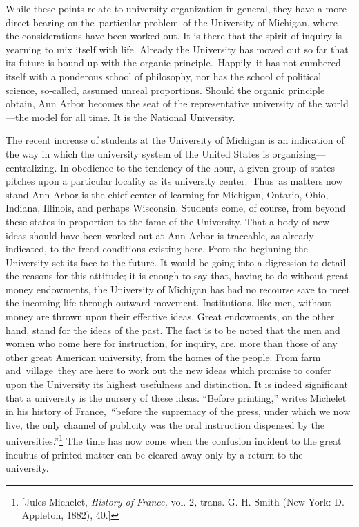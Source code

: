 \documentclass[openany,nobib]{tufte-book}
\begin{document}
While these points relate to university organization in general, they
have a more direct bearing on the~particular problem~of the University
of Michigan, where the considerations have been worked out. It is there
that the spirit of inquiry is yearning to mix itself with life. Already
the University has moved out so far that its future is bound up with the
organic principle.~Happily~it has not cumbered itself with a ponderous
school of philosophy, nor has the school of political science,
so-called, assumed unreal proportions. Should the organic principle
obtain, Ann Arbor becomes the seat of the representative university of
the world---the model for all time. It is the National University.~

The recent increase of students at the University of Michigan is an
indication of the way in which the university system of the United
States is organizing---centralizing. In obedience to the tendency of the
hour, a given group of states pitches upon a particular locality as its
university center.~Thus~as matters now stand Ann Arbor is the chief
center of learning for Michigan, Ontario, Ohio, Indiana, Illinois, and
perhaps Wisconsin. Students come, of course, from beyond these states in
proportion to the fame of the University. That a body of new ideas
should have been worked out at Ann Arbor is traceable, as already
indicated, to the freed conditions existing here. From the beginning the
University set its face to the future. It would be going into a
digression to detail the reasons for this attitude; it is enough to say
that, having to do without great money endowments, the University of
Michigan has had no recourse save to meet the incoming life through
outward movement. Institutions, like men, without money are thrown upon
their effective ideas. Great endowments, on the other hand, stand for
the ideas of the past. The fact is to be noted that the men and women
who come here for instruction, for inquiry, are, more than those of any
other great American university, from the homes of the people. From farm
and~village~they are here to work out the new ideas which promise to
confer upon the University its highest usefulness and distinction. It is
indeed significant that a university is the nursery of these ideas.
``Before printing,'' writes Michelet in his history of France,~``before
the supremacy of the press, under which we now live, the only channel of
publicity was the oral instruction dispensed by the
universities.''\footnote{{[}Jules Michelet, \emph{History of France,}
  vol. 2\emph{,} trans. G. H. Smith \emph{} (New York: D. Appleton,
  1882), 40.{]}} The time has now come when the confusion incident to
the great incubus of printed matter can be cleared away only by a return
to the university.~
\end{document}
